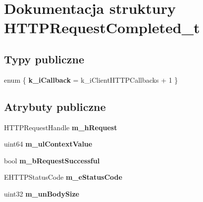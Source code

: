 \hypertarget{struct_h_t_t_p_request_completed__t}{}\section{Dokumentacja struktury H\+T\+T\+P\+Request\+Completed\+\_\+t}
\label{struct_h_t_t_p_request_completed__t}
\subsection*{Typy publiczne}
\begin{DoxyCompactItemize}
\item 
\mbox{\label{struct_h_t_t_p_request_completed__t_a0cea94d6b93c87336650c007efa521f4}} 
enum \{ {\bfseries k\+\_\+i\+Callback} = k\+\_\+i\+Client\+H\+T\+T\+P\+Callbacks + 1
 \}
\end{DoxyCompactItemize}
\subsection*{Atrybuty publiczne}
\begin{DoxyCompactItemize}
\item 
\mbox{\label{struct_h_t_t_p_request_completed__t_a8a7995a1213af71cb88aee47dc07759c}} 
H\+T\+T\+P\+Request\+Handle {\bfseries m\+\_\+h\+Request}
\item 
\mbox{\label{struct_h_t_t_p_request_completed__t_a8cbd6bf571cd7494128d55c571c05b4a}} 
uint64 {\bfseries m\+\_\+ul\+Context\+Value}
\item 
\mbox{\label{struct_h_t_t_p_request_completed__t_a40c2f0337b259d879c51080da4687da8}} 
bool {\bfseries m\+\_\+b\+Request\+Successful}
\item 
\mbox{\label{struct_h_t_t_p_request_completed__t_ab383bb6ba67d9ad42e48240c8cb6dd78}} 
E\+H\+T\+T\+P\+Status\+Code {\bfseries m\+\_\+e\+Status\+Code}
\item 
\mbox{\label{struct_h_t_t_p_request_completed__t_adce7ede47bfc556894b38034549931bf}} 
uint32 {\bfseries m\+\_\+un\+Body\+Size}
\end{DoxyCompactItemize}


